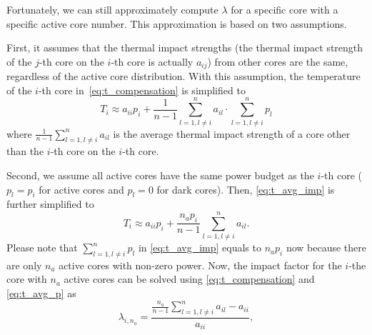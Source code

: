 Fortunately, we can still approximately compute $\lambda$ for a
specific core with a specific active core number. This approximation
is based on two assumptions.

First, it assumes that the thermal impact
strengths (the thermal impact strength of the $j$-th core on the $i$-th
core is actually $a_{ij}$) from other cores are the same, regardless of the active core
distribution. With this assumption, the temperature of the $i$-th core
in~\eqref{eq:t_compensation} is simplified to
\begin{equation}\label{eq:t_avg_imp}
T_{i} \approx a_{ii}p_{i} + \frac{1}{n-1} \sum_{l=1, l \ne
  i}^{n} a_{il} \cdot \sum_{l=1, l \ne  i}^{n} p_l
\end{equation}
where $\frac{1}{n-1} \sum_{l=1, l \ne i}^{n} a_{il}$ is the average
thermal impact strength of a core other than the $i$-th core on the
$i$-th core.

Second, we assume all active cores have the same power
budget as the $i$-th core ($p_l = p_i$ for active cores and $p_l = 0$
for dark cores). Then, \eqref{eq:t_avg_imp} is further
simplified to
\begin{equation}\label{eq:t_avg_p}
T_{i} \approx a_{ii}p_{i} + \frac{n_a p_i}{n-1} \sum_{l=1, l \ne
  i}^{n} a_{il}.
\end{equation}
Please note that $\sum_{l=1, l \ne  i}^{n} p_l$ in \eqref{eq:t_avg_imp} equals to
$n_a p_i$ now because
there are only $n_a$ active cores with non-zero power. 
Now, the impact factor for the $i$-the core with $n_a$
active cores can be solved using \eqref{eq:t_compensation} and \eqref{eq:t_avg_p} as
\begin{equation}\label{eq:lambda}
  \lambda _{i,n_a} =\frac{\frac{n_a}{n-1} \sum_{l=1, l \ne i}^{n}a_{il}-a_{ii}}{a_{ii}},
\end{equation}





